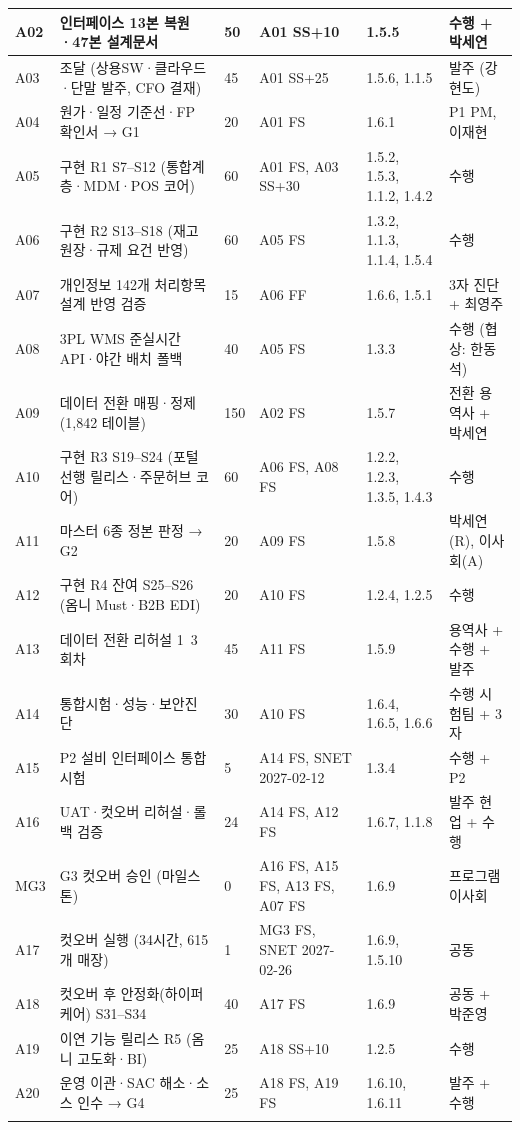 \documentclass[10pt,a4paper]{article}
\begin{document}
{\begin{longtable}{|L{12mm}|L{88mm}|C{16mm}|L{40mm}|L{56mm}|L{36mm}|}
A02 & 인터페이스 13본 복원·47본 설계문서 & 50 & A01 SS+10 & 1.5.5 & 수행 + 박세연 \\ \hline
A03 & 조달 (상용SW·클라우드·단말 발주, CFO 결재) & 45 & A01 SS+25 & 1.5.6, 1.1.5 & 발주 (강현도) \\ \hline
A04 & 원가·일정 기준선·FP 확인서 → G1 & 20 & A01 FS & 1.6.1 & P1 PM, 이재현 \\ \hline
A05 & 구현 R1 S7–S12 (통합계층·MDM·POS 코어) & 60 & A01 FS, A03 SS+30 & 1.5.2, 1.5.3, 1.1.2, 1.4.2 & 수행 \\ \hline
A06 & 구현 R2 S13–S18 (재고 원장·규제 요건 반영) & 60 & A05 FS & 1.3.2, 1.1.3, 1.1.4, 1.5.4 & 수행 \\ \hline
A07 & 개인정보 142개 처리항목 설계 반영 검증 & 15 & A06 FF & 1.6.6, 1.5.1 & 3자 진단 + 최영주 \\ \hline
A08 & 3PL WMS 준실시간 API·야간 배치 폴백 & 40 & A05 FS & 1.3.3 & 수행 (협상: 한동석) \\ \hline
A09 & 데이터 전환 매핑·정제 (1,842 테이블) & 150 & A02 FS & 1.5.7 & 전환 용역사 + 박세연 \\ \hline
A10 & 구현 R3 S19–S24 (포털 선행 릴리스·주문허브 코어) & 60 & A06 FS, A08 FS & 1.2.2, 1.2.3, 1.3.5, 1.4.3 & 수행 \\ \hline
A11 & 마스터 6종 정본 판정 → G2 & 20 & A09 FS & 1.5.8 & 박세연(R), 이사회(A) \\ \hline
A12 & 구현 R4 잔여 S25–S26 (옴니 Must·B2B EDI) & 20 & A10 FS & 1.2.4, 1.2.5 & 수행 \\ \hline
A13 & 데이터 전환 리허설 1~3회차 & 45 & A11 FS & 1.5.9 & 용역사 + 수행 + 발주 \\ \hline
A14 & 통합시험·성능·보안진단 & 30 & A10 FS & 1.6.4, 1.6.5, 1.6.6 & 수행 시험팀 + 3자 \\ \hline
A15 & P2 설비 인터페이스 통합시험 & 5 & A14 FS, SNET 2027-02-12 & 1.3.4 & 수행 + P2 \\ \hline
A16 & UAT·컷오버 리허설·롤백 검증 & 24 & A14 FS, A12 FS & 1.6.7, 1.1.8 & 발주 현업 + 수행 \\ \hline
MG3 & G3 컷오버 승인 (마일스톤) & 0 & A16 FS, A15 FS, A13 FS, A07 FS & 1.6.9 & 프로그램 이사회 \\ \hline
A17 & 컷오버 실행 (34시간, 615개 매장) & 1 & MG3 FS, SNET 2027-02-26 & 1.6.9, 1.5.10 & 공동 \\ \hline
A18 & 컷오버 후 안정화(하이퍼케어) S31–S34 & 40 & A17 FS & 1.6.9 & 공동 + 박준영 \\ \hline
A19 & 이연 기능 릴리스 R5 (옴니 고도화·BI) & 25 & A18 SS+10 & 1.2.5 & 수행 \\ \hline
A20 & 운영 이관·SAC 해소·소스 인수 → G4 & 25 & A18 FS, A19 FS & 1.6.10, 1.6.11 & 발주 + 수행 \\ \hline
\fi
\end{longtable}}
\end{document}

